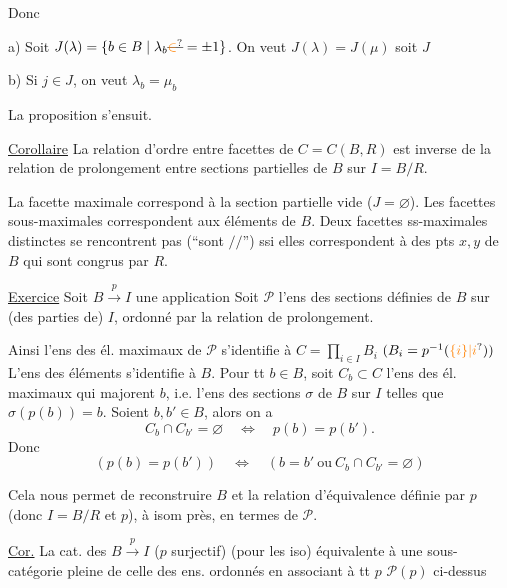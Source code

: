 Donc 

a) Soit $J(\lambda)=\{b\in B\mid\lambda_b\deleted{\unsure{\in}}=\pm1\}$. On veut $J(\lambda)=J(\mu)$ soit $J$

b) Si $j\in J$, on veut $\lambda_b=\mu_b$

La proposition s'ensuit.

\uline{Corollaire} La relation d'ordre entre facettes
de $C=C(B,R)$ est inverse de la relation de
prolongement entre sections partielles de
$B$ sur $I=B/R$.

La facette maximale correspond à la section
partielle vide ($J=\varnothing$). Les facettes sous-maximales correspondent aux éléments de $B$.
Deux facettes ss-maximales distinctes  se rencontrent
pas (``sont $//$'') ssi elles correspondent à des pts
$x,y$ de $B$ qui sont congrus par $R$.

\uline{Exercice} Soit $B\xrightarrow{p}I$ une application   Soit $\mathcal P$ l'ens des sections
 définies de $B$ sur (des parties de) $I$,
 ordonné par la relation de prolongement.

  Ainsi l'ens des él. maximaux
de $\mathcal P$ s'identifie à $C=\prod_{i\in I}B_i$ $(B_i=p^{-1}(\unsure{\{i\}|i}))$
L'ens des éléments   s'identifie à
$B$. Pour tt $b\in B$, soit  $C_b\subset C$ l'ens
des él. maximaux  qui majorent $b$,
i.e. l'ens des sections $\sigma$ de $B$ sur $I$ telles
que $\sigma(p(b))=b$. Soient $b,b'\in B$,  alors
on a
\[
 C_b\cap C_{b'}=\varnothing\quad\Longleftrightarrow\quad p(b)=p(b').
\]
Donc 
\[
 (p(b)=p(b'))\quad\Longleftrightarrow\quad(b=b'\ \text{ou}\ C_b\cap C_{b'}=\varnothing)
\]

Cela nous permet de reconstruire $B$ et
la relation d'équivalence  définie par $p$ 
 (donc $I=B/R$ et $p$), à isom près, en
termes de $\mathcal P$.

\uline{Cor.} La cat. des $B\xrightarrow{p}I$ ($p$ surjectif)
(pour les iso) équivalente à une sous-catégorie
pleine de celle des ens. ordonnés
en associant à tt $p$  $\mathcal P(p)$ ci-dessus

